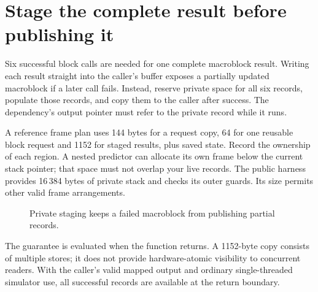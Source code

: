 \section{Stage the complete result before publishing it}
Six successful block calls are needed for one complete macroblock result.
Writing each result straight into the caller's buffer exposes a partially updated
macroblock if a later call fails. Instead, reserve private space for all six
records, populate those records, and copy them to the caller after success.
The dependency's output pointer must refer to the private record while it runs.

A reference frame plan uses 144 bytes for a request copy, 64 for one reusable
block request and 1152 for staged results, plus saved state. Record the ownership
of each region. A nested predictor can allocate its own frame below the current
stack pointer; that space must not overlap your live records. The public harness
provides 16\,384 bytes of private stack and checks its outer guards. Its size
permits other valid frame arrangements.

\begin{figure}[htbp]
  \centering
  \caption{Private staging keeps a failed macroblock from publishing partial records.}
\end{figure}

The guarantee is evaluated when the function returns. A 1152-byte copy consists
of multiple stores; it does not provide hardware-atomic visibility to concurrent
readers. With the caller's valid mapped output and ordinary single-threaded
simulator use, all successful records are available at the return boundary.

